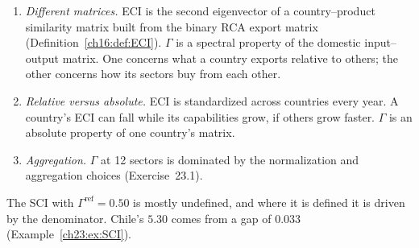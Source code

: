 \documentclass[../solutions_manual.tex]{subfiles}
\begin{document}
\begin{enumerate}
\item \emph{Different matrices.} ECI is the second eigenvector of a country--product similarity matrix built from the binary RCA export matrix (Definition~\ref{ch16:def:ECI}). $\Gamma$ is a spectral property of the domestic input--output matrix. One concerns what a country exports relative to others; the other concerns how its sectors buy from each other.
\item \emph{Relative versus absolute.} ECI is standardized across countries every year. A country's ECI can fall while its capabilities grow, if others grow faster. $\Gamma$ is an absolute property of one country's matrix.
\item \emph{Aggregation.} $\Gamma$ at 12 sectors is dominated by the normalization and aggregation choices (Exercise~23.1).
\end{enumerate}
The SCI with $\Gamma^{\text{ref}} = 0.50$ is mostly undefined, and where it is defined it is driven by the denominator. Chile's $5.30$ comes from a gap of $0.033$ (Example~\ref{ch23:ex:SCI}).

\end{document}
